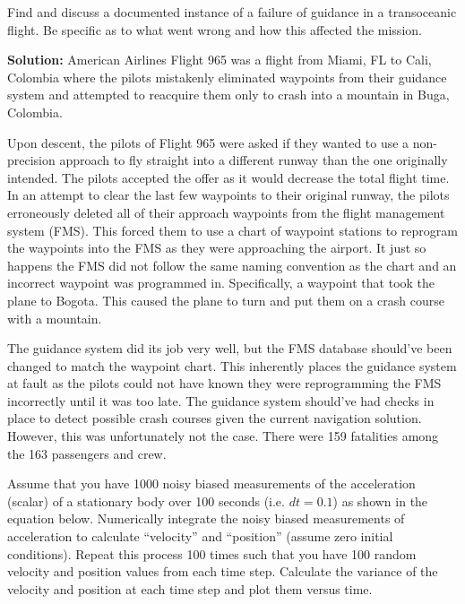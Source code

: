 \documentclass[12pt,letterpaper, onecolumn]{exam}
\renewcommand{\solution}{\noindent\textbf{Solution:}\enspace}
\begin{document}
\begin{questions}
    \clearpage

    \question
    Find and discuss a documented instance of a failure of guidance in a transoceanic
    flight. Be specific as to what went wrong and how this affected the mission.

    \solution
    American Airlines Flight 965 was a flight from Miami, FL to Cali, Colombia where the pilots mistakenly eliminated waypoints from their guidance system and attempted to reacquire them only to crash into a mountain in Buga, Colombia.

    Upon descent, the pilots of Flight 965 were asked if they wanted to use a non-precision approach to fly straight into a different runway than the one originally intended. The pilots accepted the offer as it would decrease the total flight time. In an attempt to clear the last few waypoints to their original runway, the pilots erroneously deleted all of their approach waypoints from the flight management system (FMS). This forced them to use a chart of waypoint stations to reprogram the waypoints into the FMS as they were approaching the airport. It just so happens the FMS did not follow the same naming convention as the chart and an incorrect waypoint was programmed in. Specifically, a waypoint that took the plane to Bogota. This caused the plane to turn and put them on a crash course with a mountain.

    The guidance system did its job very well, but the FMS database should've been changed to match the waypoint chart. This inherently places the guidance system at fault as the pilots could not have known they were reprogramming the FMS incorrectly until it was too late. The guidance system should've had checks in place to detect possible crash courses given the current navigation solution. However, this was unfortunately not the case. There were 159 fatalities among the 163 passengers and crew.

    \clearpage

    \question
    Assume that you have 1000 noisy biased measurements of the acceleration (scalar) of
    a stationary body over 100 seconds (i.e. $dt = 0.1$) as shown in the equation below.
    Numerically integrate the noisy biased measurements of acceleration to calculate
    “velocity” and “position” (assume zero initial conditions). Repeat this process 100
    times such that you have 100 random velocity and position values from each time
    step. Calculate the variance of the velocity and position at each time step and plot
    them versus time.


\end{questions}
\end{document}
